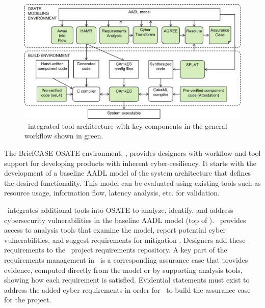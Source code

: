\begin{figure}
	\begin{center}
	  \includegraphics[width=\textwidth]{./figs/tool-arch.jpg}
  	\end{center}
	\caption{\brfcs\ integrated tool architecture with key components in the general workflow shown in green.} 
	\label{fig:tool-arch} 
\end{figure}

The BriefCASE OSATE environment, , provides designers with workflow and tool support for developing products with inherent cyber-resiliency.
It starts with the development of a baseline AADL model of the system architecture that defines the desired functionality.
This model can be evaluated using existing tools such as resource usage, information flow, latency analysis, etc. for validation.

\brfcs\ integrates additional tools into OSATE to analyze, identify, and address cybersecurity vulnerabilities in the baseline AADL model (top of ).
\brfcs\ provides access to analysis tools that examine the model, report potential cyber vulnerabilities,
and suggest requirements for mitigation \cite{dcrypps2019,gearcase2020}.
Designers add these requirements to the \brfcs\ project requirements repository. 
A key part of the requirements management in \brfcs\ is a corresponding assurance case that provides evidence, computed directly from the model or by supporting analysis tools, showing how each requirement is satisfied.
Evidential statements must exist to address the added cyber requirements in order for \brfcs\ to build the assurance case for the project.

